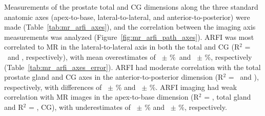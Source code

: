 Measurements of the prostate total and CG dimensions along the three standard
anatomic axes (apex-to-base, lateral-to-lateral, and anterior-to-posterior)
were made (Table~\ref{tab:mr_arfi_axes}), and the correlation between the
imaging axis measurements was analyzed (Figure~\ref{fig:mr_arfi_path_axes}).
ARFI was most correlated to MR in the lateral-to-lateral axis in both the total
and CG (R$^2$ = \totalLatLatRsq~and \centralLatLatRsq, respectively), with mean
overestimates of \ARFImrTotalLatLatMeanPct~$\pm$ \ARFImrTotalLatLatStdPct\%~and
\ARFImrCentralLatLatMeanPct~$\pm$ \ARFImrCentralLatLatStdPct\%, respectively
(Table~\ref{tab:mr_arfi_axes_error}).  ARFI had moderate correlation with the
total prostate gland and CG axes in the anterior-to-posterior dimension (R$^2$
= \totalAntPostRsq~and \centralAntPostRsq), respectively, with differences of
\ARFImrTotalAntPostMeanPct~$\pm$ \ARFImrTotalAntPostStdPct\% and
\ARFImrCentralAntPostMeanPct~$\pm$ \ARFImrCentralAntPostStdPct\%.  ARFI imaging
had weak correlation with MR images in the apex-to-base dimension (R$^2$ =
\totalApexBaseRsq, total gland and R$^2$ = \centralApexBaseRsq, CG),
with underestimates of \ARFImrTotalApexBaseMeanPct~$\pm$
\ARFImrTotalApexBaseStdPct\% and \ARFImrCentralApexBaseMeanPct~$\pm$
\ARFImrCentralApexBaseStdPct\%, respectively.





%

%

%
